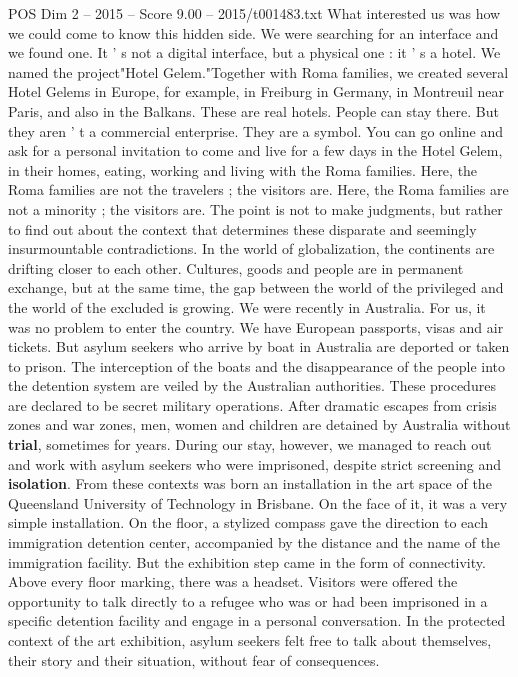 \begin{textsample}{POS Dim 2 – 2015 – Score 9.00 – 2015/t001483.txt}
What interested us was how we could come to know this hidden side.
We were searching for an interface and we found one.
It ' s not a digital interface, but a physical one : it ' s a hotel.
We named the project"Hotel Gelem."Together with Roma families, we created several Hotel Gelems in Europe, for example, in Freiburg in Germany, in Montreuil near Paris, and also in the Balkans.
These are real hotels.
People can stay there.
But they aren ' t a commercial enterprise.
They are a symbol.
You can go online and ask for a personal invitation to come and live for a few days in the Hotel Gelem, in their homes, eating, working and living with the Roma families.
Here, the Roma families are not the travelers ; the visitors are.
Here, the Roma families are not a minority ; the visitors are.
The point is not to make judgments, but rather to find out about the context that determines these disparate and seemingly insurmountable contradictions.
In the world of globalization, the continents are drifting closer to each other.
Cultures, goods and people are in permanent exchange, but at the same time, the gap between the world of the privileged and the world of the excluded is growing.
We were recently in Australia.
For us, it was no problem to enter the country.
We have European passports, visas and air tickets.
But asylum seekers who arrive by boat in Australia are deported or taken to prison.
The interception of the boats and the disappearance of the people into the detention system are veiled by the Australian authorities.
These procedures are declared to be secret military operations.
After dramatic escapes from crisis zones and war zones, men, women and children are detained by Australia without \textbf{trial}, sometimes for years.
During our stay, however, we managed to reach out and work with asylum seekers who were imprisoned, despite strict screening and \textbf{isolation}.
From these contexts was born an installation in the art space of the Queensland University of Technology in Brisbane.
On the face of it, it was a very simple installation.
On the floor, a stylized compass gave the direction to each immigration detention center, accompanied by the distance and the name of the immigration facility.
But the exhibition step came in the form of connectivity.
Above every floor marking, there was a headset.
Visitors were offered the opportunity to talk directly to a refugee who was or had been imprisoned in a specific detention facility and engage in a personal conversation.
In the protected context of the art exhibition, asylum seekers felt free to talk about themselves, their story and their situation, without fear of consequences.

\end{textsample}

